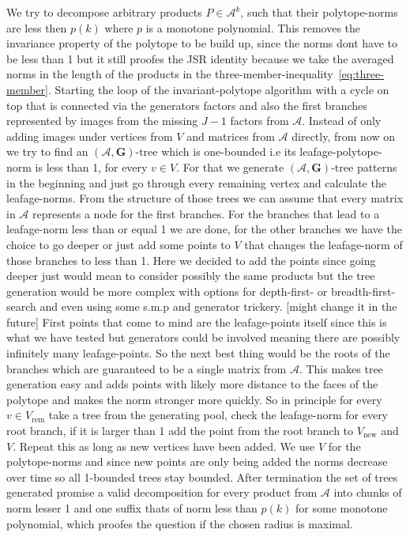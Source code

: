 We try to decompose arbitrary products $P \in \mathcal{A}^k$, such that their polytope-norms are less then $p(k)$ where $p$ is a monotone polynomial.
This removes the invariance property of the polytope to be build up, since the norms dont have to be less than 1 but it still proofes the JSR identity because we take the averaged norms in the length of the products in the three-member-inequality~\ref{eq:three-member}.
\newline 
Starting the loop of the invariant-polytope algorithm with a cycle on top that is connected via the generators factors and also the first branches represented by images from the missing $J-1$ factors from $\mathcal{A}$. Instead of only adding images under vertices from $V$ and matrices from $\mathcal{A}$ directly, from now on we try to find an $(\mathcal{A},\mathbf{G})\text{-tree}$ which is one-bounded i.e its leafage-polytope-norm is less than 1, for every $v \in V$.
For that we generate $(\mathcal{A},\mathbf{G})\text{-tree}$ patterns in the beginning and just go through every remaining vertex and calculate the leafage-norms. From the structure of those trees we can assume that every matrix in $\mathcal{A}$ represents a node for the first branches.
For the branches that lead to a leafage-norm less than or equal 1 we are done, for the other branches we have the choice to go deeper or just add some points to $V$ that changes the leafage-norm of those branches to less than 1. Here we decided to add the points since going deeper just would mean to consider possibly the same products but the tree generation would be more complex with options for depth-first- or breadth-first-search and even using some s.m.p and generator trickery. [might change it in the future]
\newline
First points that come to mind are the leafage-points itself since this is what we have tested but generators could be involved meaning there are possibly infinitely many leafage-points. So the next best thing would be the roots of the branches which are guaranteed to be a single matrix from $\mathcal{A}$. This makes tree generation easy and adds points with likely more distance to the faces of the polytope and makes the norm stronger more quickly.
\newline
So in principle for every $v \in V_{\text{rem}}$ take a tree from the generating pool, check the leafage-norm for every root branch, if it is larger than 1 add the point from the root branch to $V_{\text{new}}$ and $V$. Repeat this as long as new vertices have been added. We use $V$ for the polytope-norms and since new points are only being added the norms decrease over time so all 1-bounded trees stay bounded.
\newline
After termination the set of trees generated promise a valid decomposition for every product from $\mathcal{A}$ into chunks of norm lesser 1 and one suffix thats of norm less than $p(k)$ for some monotone polynomial, which proofes the question if the chosen radius is maximal.

